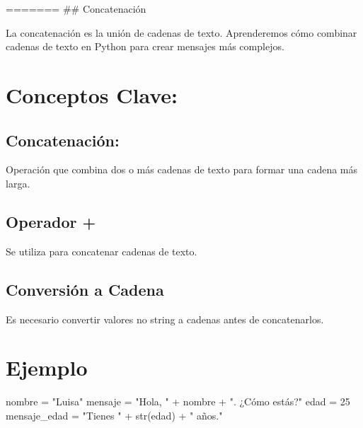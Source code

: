 \documentclass[
  a4paper,
  DIV=11,
  numbers=noendperiod,
  onepage,
  openany]{scrreprt}
\newenvironment{Shaded}{\begin{snugshade}}{\end{snugshade}}
\newcommand{\BuiltInTok}[1]{\textcolor[rgb]{0.00,0.23,0.31}{#1}}
\newcommand{\DecValTok}[1]{\textcolor[rgb]{0.68,0.00,0.00}{#1}}
\newcommand{\NormalTok}[1]{\textcolor[rgb]{0.00,0.23,0.31}{#1}}
\newcommand{\OperatorTok}[1]{\textcolor[rgb]{0.37,0.37,0.37}{#1}}
\newcommand{\StringTok}[1]{\textcolor[rgb]{0.13,0.47,0.30}{#1}}
\begin{document}
======= \#\# Concatenación

La concatenación es la unión de cadenas de texto. Aprenderemos cómo
combinar cadenas de texto en Python para crear mensajes más complejos.

\hypertarget{conceptos-clave-15}{%
\section{Conceptos Clave:}\label{conceptos-clave-15}}

\hypertarget{concatenaciuxf3n-2}{%
\subsection{Concatenación:}\label{concatenaciuxf3n-2}}

Operación que combina dos o más cadenas de texto para formar una cadena
más larga.

\hypertarget{operador-1}{%
\subsection{Operador +}\label{operador-1}}

Se utiliza para concatenar cadenas de texto.

\hypertarget{conversiuxf3n-a-cadena-1}{%
\subsection{Conversión a Cadena}\label{conversiuxf3n-a-cadena-1}}

Es necesario convertir valores no string a cadenas antes de
concatenarlos.

\hypertarget{ejemplo-15}{%
\section{Ejemplo}\label{ejemplo-15}}

\begin{Shaded}
\begin{Highlighting}[]
\NormalTok{nombre }\OperatorTok{=} \StringTok{"Luisa"}
\NormalTok{mensaje }\OperatorTok{=} \StringTok{"Hola, "} \OperatorTok{+}\NormalTok{ nombre }\OperatorTok{+} \StringTok{". ¿Cómo estás?"}
\NormalTok{edad }\OperatorTok{=} \DecValTok{25}
\NormalTok{mensaje\_edad }\OperatorTok{=} \StringTok{"Tienes "} \OperatorTok{+} \BuiltInTok{str}\NormalTok{(edad) }\OperatorTok{+} \StringTok{" años."}
\end{Highlighting}
\end{Shaded}
\end{document}
